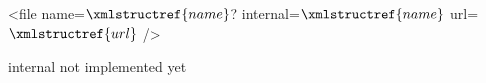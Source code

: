 <file name=$\xmlstructref{name}$? internal=$\xmlstructref{name}$ url=$\xmlstructref{url}$ />

internal not implemented yet
